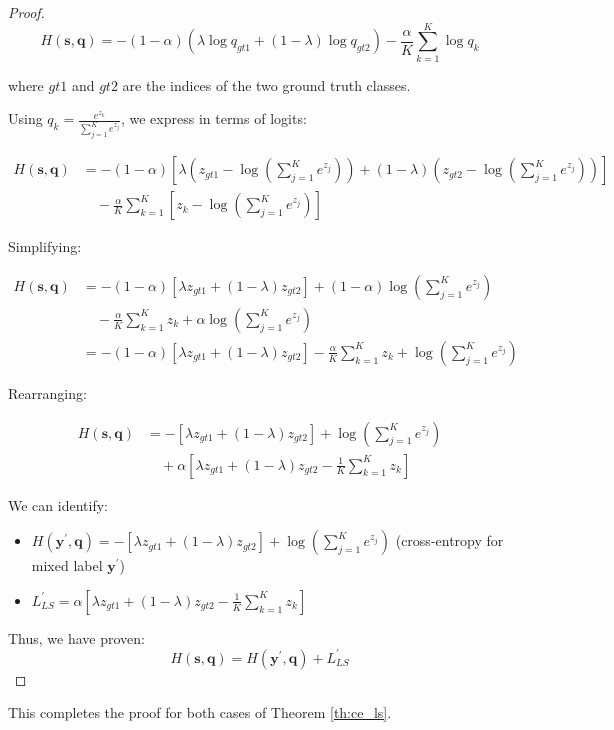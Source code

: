 \begin{proof}
\begin{equation}
H(\mathbf{s}, \mathbf{q}) = -(1 - \alpha)(\lambda \log q_{gt1} + (1-\lambda) \log q_{gt2}) - \frac{\alpha}{K}\sum_{k=1}^{K} \log q_k
\end{equation}

where $gt1$ and $gt2$ are the indices of the two ground truth classes.

Using $q_k = \frac{e^{z_k}}{\sum_{j=1}^{K} e^{z_j}}$, we express in terms of logits:

\begin{align}
H(\mathbf{s}, \mathbf{q}) &= -(1 - \alpha)[\lambda (z_{gt1} - \log(\sum_{j=1}^{K} e^{z_j})) + (1-\lambda) (z_{gt2} - \log(\sum_{j=1}^{K} e^{z_j}))] \\
&\quad - \frac{\alpha}{K}\sum_{k=1}^{K} [z_k - \log(\sum_{j=1}^{K} e^{z_j})]
\end{align}

Simplifying:

\begin{align}
H(\mathbf{s}, \mathbf{q}) &= -(1 - \alpha)[\lambda z_{gt1} + (1-\lambda) z_{gt2}] + (1 - \alpha)\log(\sum_{j=1}^{K} e^{z_j}) \\
&\quad - \frac{\alpha}{K}\sum_{k=1}^{K} z_k + \alpha\log(\sum_{j=1}^{K} e^{z_j}) \\
&= -(1 - \alpha)[\lambda z_{gt1} + (1-\lambda) z_{gt2}] - \frac{\alpha}{K}\sum_{k=1}^{K} z_k + \log(\sum_{j=1}^{K} e^{z_j})
\end{align}

Rearranging:

\begin{align}
H(\mathbf{s}, \mathbf{q}) &= -[\lambda z_{gt1} + (1-\lambda) z_{gt2}] + \log(\sum_{j=1}^{K} e^{z_j}) \\
&\quad + \alpha[\lambda z_{gt1} + (1-\lambda) z_{gt2} - \frac{1}{K}\sum_{k=1}^{K} z_k]
\end{align}

We can identify:
\begin{itemize}
    \item $H(\mathbf{y}^{\prime}, \mathbf{q}) = -[\lambda z_{gt1} + (1-\lambda) z_{gt2}] + \log(\sum_{j=1}^{K} e^{z_j})$ (cross-entropy for mixed label $\mathbf{y}^{\prime}$)
    \item $L^{\prime}_{\textit{LS}} = \alpha[\lambda z_{gt1} + (1-\lambda) z_{gt2} - \frac{1}{K}\sum_{k=1}^{K} z_k]$
\end{itemize}

Thus, we have proven:
\begin{equation}
H(\mathbf{s}, \mathbf{q}) = H(\mathbf{y}^{\prime}, \mathbf{q}) + L^{\prime}_{\textit{LS}}
\end{equation}
\end{proof}
This completes the proof for both cases of Theorem \ref{th:ce_ls}.


